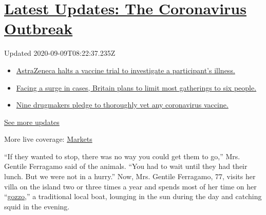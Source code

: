 \hypertarget{latest-updates-the-coronavirus-outbreak}{%
\section{\texorpdfstring{\href{https://www.nytimes3xbfgragh.onion/2020/09/08/world/covid-19-coronavirus.html?action=click\&pgtype=Article\&state=default\&region=MAIN_CONTENT_1\&context=storylines_live_updates}{Latest
Updates: The Coronavirus
Outbreak}}{Latest Updates: The Coronavirus Outbreak}}\label{latest-updates-the-coronavirus-outbreak}}

Updated 2020-09-09T08:22:37.235Z

\begin{itemize}
\tightlist
\item
  \href{https://www.nytimes3xbfgragh.onion/2020/09/08/world/covid-19-coronavirus.html?action=click\&pgtype=Article\&state=default\&region=MAIN_CONTENT_1\&context=storylines_live_updates\#link-313b443d}{AstraZeneca
  halts a vaccine trial to investigate a participant's illness.}
\item
  \href{https://www.nytimes3xbfgragh.onion/2020/09/08/world/covid-19-coronavirus.html?action=click\&pgtype=Article\&state=default\&region=MAIN_CONTENT_1\&context=storylines_live_updates\#link-4438dd7}{Facing
  a surge in cases, Britain plans to limit most gatherings to six
  people.}
\item
  \href{https://www.nytimes3xbfgragh.onion/2020/09/08/world/covid-19-coronavirus.html?action=click\&pgtype=Article\&state=default\&region=MAIN_CONTENT_1\&context=storylines_live_updates\#link-679303d7}{Nine
  drugmakers pledge to thoroughly vet any coronavirus vaccine.}
\end{itemize}

\href{https://www.nytimes3xbfgragh.onion/2020/09/08/world/covid-19-coronavirus.html?action=click\&pgtype=Article\&state=default\&region=MAIN_CONTENT_1\&context=storylines_live_updates}{See
more updates}

More live coverage:
\href{https://www.nytimes3xbfgragh.onion/live/2020/09/08/business/stock-market-today-coronavirus?action=click\&pgtype=Article\&state=default\&region=MAIN_CONTENT_1\&context=storylines_live_updates}{Markets}

``If they wanted to stop, there was no way you could get them to go,''
Mrs. Gentile Ferragamo said of the animals. ``You had to wait until they
had their lunch. But we were not in a hurry.'' Now, Mrs. Gentile
Ferragamo, 77, visits her villa on the island two or three times a year
and spends most of her time on her
``\href{https://www.capri.com/en/b/rent-a-gozzo-boat-on-capri}{gozzo},''
a traditional local boat, lounging in the sun during the day and
catching squid in the evening.

